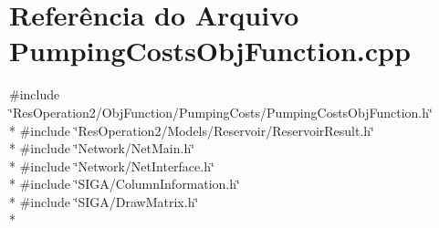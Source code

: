 \section{Referência do Arquivo Pumping\+Costs\+Obj\+Function.\+cpp}
\label{_2_obj_function_2_pumping_costs_2_pumping_costs_obj_function_8cpp}
{\ttfamily \#include \char`\"{}Res\+Operation2/\+Obj\+Function/\+Pumping\+Costs/\+Pumping\+Costs\+Obj\+Function.\+h\char`\"{}}\\*
{\ttfamily \#include \char`\"{}Res\+Operation2/\+Models/\+Reservoir/\+Reservoir\+Result.\+h\char`\"{}}\\*
{\ttfamily \#include \char`\"{}Network/\+Net\+Main.\+h\char`\"{}}\\*
{\ttfamily \#include \char`\"{}Network/\+Net\+Interface.\+h\char`\"{}}\\*
{\ttfamily \#include \char`\"{}S\+I\+G\+A/\+Column\+Information.\+h\char`\"{}}\\*
{\ttfamily \#include \char`\"{}S\+I\+G\+A/\+Draw\+Matrix.\+h\char`\"{}}\\*
